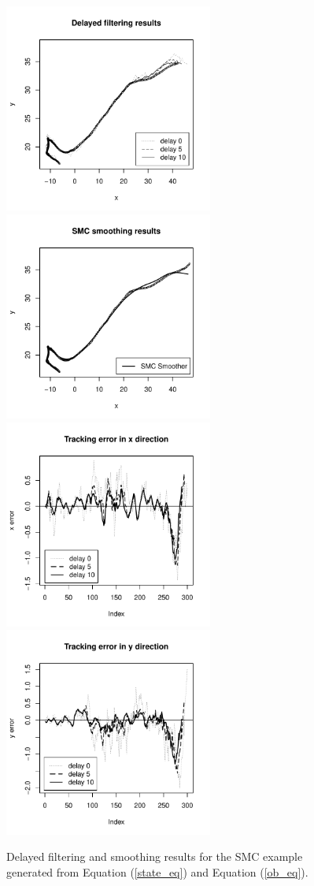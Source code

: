 \begin{figure}
\centering
\includegraphics[width=2.7in]{SMC2.pdf}
\includegraphics[width=2.7in]{SMC5.pdf}
\includegraphics[width=2.7in]{SMC3.pdf}
\includegraphics[width=2.7in]{SMC4.pdf}
\caption{Delayed filtering and smoothing results for the SMC example generated from Equation (\ref{state_eq}) and Equation (\ref{ob_eq}).}
\label{fig:SMC2}
\end{figure}


